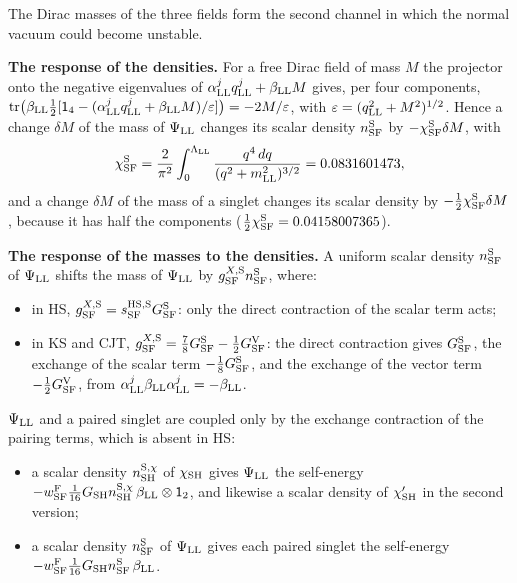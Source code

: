\documentclass[
  10pt,
]{article}
\providecommand{\tightlist}{%
  \setlength{\itemsep}{0pt}\setlength{\parskip}{0pt}}
\begin{document}
The Dirac masses of the three fields form the second channel in which
the normal vacuum could become unstable.

\textbf{The response of the densities.} For a free Dirac field of mass
\(M\) the projector onto the negative eigenvalues of
\(\alpha^j_{\rm LL}q^j_{\rm LL}+\beta_{\rm LL}M\) gives, per four
components,
\(\mathrm{tr}\big(\beta_{\rm LL}\tfrac12[\mathsf 1_4-(\alpha^j_{\rm LL}q^j_{\rm LL}+\beta_{\rm LL}M)/\varepsilon]\big)=-2M/\varepsilon\),
with \(\varepsilon=(q_{\rm LL}^2+M^2)^{1/2}\). Hence a change
\(\delta M\) of the mass of \(\Psi_{\rm LL}\) changes its scalar density
\(n^{\rm S}_{\rm SF}\) by \(-\chi^{\rm S}_{\rm SF}\delta M\), with
\[\chi^{\rm S}_{\rm SF}=\frac2{\pi^2}\int_0^{\Lambda_{\rm LL}}\frac{q^4\,dq}{(q^2+m_{\rm LL}^2)^{3/2}}=0.0831601473,\]
and a change \(\delta M\) of the mass of a singlet changes its scalar
density by \(-\tfrac12\chi^{\rm S}_{\rm SF}\delta M\), because it has
half the components (\(\tfrac12\chi^{\rm S}_{\rm SF}=0.04158007365\)).

\textbf{The response of the masses to the densities.} A uniform scalar
density \(n^{\rm S}_{\rm SF}\) of \(\Psi_{\rm LL}\) shifts the mass of
\(\Psi_{\rm LL}\) by \(g^{X,{\rm S}}_{\rm SF}n^{\rm S}_{\rm SF}\),
where:

\begin{itemize}
\tightlist
\item
  in HS,
  \(g^{X,{\rm S}}_{\rm SF}=s^{\rm HS,S}_{\rm SF}G^{\rm S}_{\rm SF}\):
  only the direct contraction of the scalar term acts;
\item
  in KS and CJT,
  \(g^{X,{\rm S}}_{\rm SF}=\tfrac78G^{\rm S}_{\rm SF}-\tfrac12G^{\rm V}_{\rm SF}\):
  the direct contraction gives \(G^{\rm S}_{\rm SF}\), the exchange of
  the scalar term \(-\tfrac18G^{\rm S}_{\rm SF}\), and the exchange of
  the vector term \(-\tfrac12G^{\rm V}_{\rm SF}\), from
  \(\alpha^j_{\rm LL}\beta_{\rm LL}\alpha^j_{\rm LL}=-\beta_{\rm LL}\).
\end{itemize}

\(\Psi_{\rm LL}\) and a paired singlet are coupled only by the exchange
contraction of the pairing terms, which is absent in HS:

\begin{itemize}
\tightlist
\item
  a scalar density \(n^{{\rm S},\chi}_{\rm SH}\) of \(\chi_{\rm SH}\)
  gives \(\Psi_{\rm LL}\) the self-energy
  \(-w^{\rm F}_{\rm SF}\tfrac1{16}G_{\rm SH}n^{{\rm S},\chi}_{\rm SH}\,\beta_{\rm LL}\otimes\mathsf 1_2\),
  and likewise a scalar density of \(\chi'_{\rm SH}\) in the second
  version;
\item
  a scalar density \(n^{\rm S}_{\rm SF}\) of \(\Psi_{\rm LL}\) gives
  each paired singlet the self-energy
  \(-w^{\rm F}_{\rm SF}\tfrac1{16}G_{\rm SH}n^{\rm S}_{\rm SF}\,\beta_{\rm LL}\).
\end{itemize}
\end{document}
